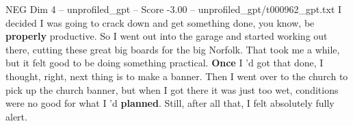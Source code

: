 \begin{textsample}{NEG Dim 4 – unprofiled\_gpt – Score -3.00 – unprofiled\_gpt/t000962\_gpt.txt}  \label{ex:f4_neg_025}
I decided I was going to crack down and get something done, you know, be \textbf{properly} productive.
So I went out into the garage and started working out there, cutting these great big boards for the big Norfolk.
That took me a while, but it felt good to be doing something practical. \textbf{Once} I ’d got that done, I thought, right, next thing is to make a banner.
Then I went over to the church to pick up the church banner, but when I got there it was just too wet, conditions were no good for what I ’d \textbf{planned}.
Still, after all that, I felt absolutely fully alert.

\end{textsample}
